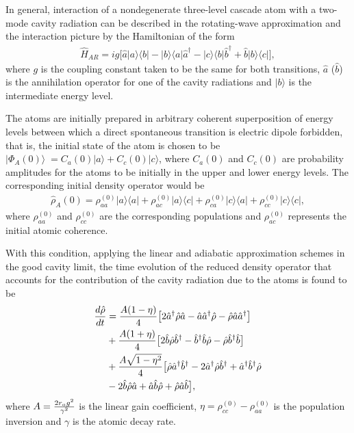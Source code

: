 \documentclass[twocolumn,showpacs,preprintnumbers,amsmath,amssymb,pra]{revtex4}
\begin{document}
In general, interaction of a nondegenerate three-level cascade atom with a two-mode
cavity radiation can be described in the rotating-wave approximation and
the interaction picture by the Hamiltonian of the form
\begin{align}\label{s11}\hat{H}_{AR}=ig\big[\hat{a}|a\rangle\langle b|-|b\rangle\langle a|\hat{a}^{\dagger} -|c\rangle\langle b|\hat{b}^{\dagger} +\hat{b}|b\rangle\langle c|\big],\end{align} where $g$ is
the coupling constant taken to be the same for both transitions, 
$\hat{a}$ ($\hat{b}$) is the annihilation operator for one of the cavity radiations and $|b\rangle$ is the intermediate energy level.  

The atoms are initially prepared in arbitrary coherent superposition of energy levels between which a direct spontaneous transition is electric dipole forbidden, that is, the initial state of the
atom is chosen to be $|\Phi_{A}(0)\rangle\; = C_{a}(0)|a\rangle +
C_{c}(0)|c\rangle$, where $C_{a}(0)$ and $C_{c}(0)$ are probability amplitudes for the atoms to be initially in the upper and lower energy levels. The corresponding initial
density operator would be
\begin{align}\label{s12}\hat{\rho}_{A}(0) =\rho_{aa}^{(0)}|a\rangle\langle a| +\rho_{ac}^{(0)}|a\rangle\langle c| + \rho_{ca}^{(0)}|c\rangle\langle a| +\rho_{cc}^{(0)}|c\rangle\langle c|,\end{align} where
$\rho_{aa}^{(0)}$ and $\rho_{cc}^{(0)}$ are the corresponding populations and $\rho_{ac}^{(0)}$ represents the initial atomic coherence.

With this condition, applying the linear and
adiabatic approximation schemes  in the good cavity limit, the time
evolution of the reduced density operator that accounts for the
contribution of the cavity radiation due to the atoms is found to be \cite{pra79033810}
\begin{align}\label{s13}\frac{d\hat{\rho}}{dt} &= \frac{A(1-\eta)}{4} \big[2\hat{a}^{\dagger}\hat{\rho}\hat{a} -
\hat{a}\hat{a}^{\dagger}\hat{\rho} -\hat{\rho}\hat{a}\hat{a}^{\dagger}\big] \notag\\&+
\frac{A(1+\eta)}{4}\big[2\hat{b}\hat{\rho}\hat{b}^{\dagger} -\hat{b}^{\dagger}\hat{b}\hat{\rho} -
\hat{\rho}\hat{b}^{\dagger}\hat{b}\big] \notag\\& +\frac{A\sqrt{1-\eta^{2}}}{4}\big[\hat{\rho}\hat{a}^{\dagger}\hat{b}^{\dagger}
-2\hat{a}^{\dagger}\hat{\rho}\hat{b}^{\dagger} +\hat{a}^{\dagger}\hat{b}^{\dagger}\hat{\rho}\notag\\&-
2\hat{b}\hat{\rho}\hat{a} + \hat{a}\hat{b}\hat{\rho} +\hat{\rho}\hat{a}\hat{b}\big],\end{align} where $A={2r_{a}g^{2}\over\gamma^{2}}$ is the linear gain coefficient, $\eta=\rho_{cc}^{(0)}-\rho_{aa}^{(0)}$ is the population inversion and $\gamma$ is the atomic decay rate.
\end{document}
